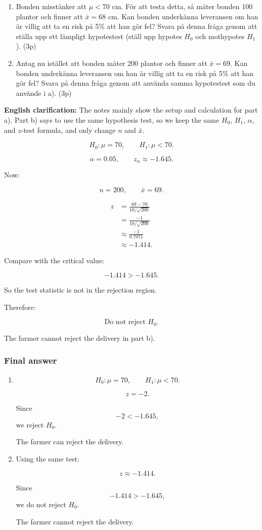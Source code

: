 \documentclass[10pt]{article}
\begin{document}
\begin{enumerate}[label=\alph*)]
\item Bonden misstänker att \(\mu<70\) cm.
För att testa detta, så mäter bonden 100 plantor
och finner att \(\bar{x}=68\) cm.
Kan bonden underkänna leveransen om han är villig
att ta en risk på 5\% att han gör fel?
Svara på denna fråga genom att ställa upp ett
lämpligt hypotestest (ställ upp hypotes \(H_0\)
och mothypotes \(H_1\)).
\hfill (3p)

\item Antag nu istället att bonden mäter 200 plantor
och finner att \(\bar{x}=69\).
Kan bonden underkänna leveransen om han är villig
att ta en risk på 5\% att han gör fel?
Svara på denna fråga genom att använda samma
hypotestest som du använde i a).
\hfill (3p)
\end{enumerate}

\textbf{English clarification:}
The notes mainly show the setup and calculation for
part a). Part b) says to use the same hypothesis test,
so we keep the same \(H_0\), \(H_1\), \(\alpha\),
and \(z\)-test formula, and only change \(n\)
and \(\bar{x}\).

\[
H_0:\mu=70,
\qquad
H_1:\mu<70.
\]

\[
\alpha=0.05,
\qquad
z_\alpha\approx -1.645.
\]

Now:

\[
n=200,
\qquad
\bar{x}=69.
\]

\begin{align*}
z
&=
\frac{69-70}
{10/\sqrt{200}} \\[2mm]
&=
\frac{-1}
{10/\sqrt{200}} \\[2mm]
&\approx
\frac{-1}{0.7071} \\[2mm]
&\approx -1.414.
\end{align*}

Compare with the critical value:

\[
-1.414>-1.645.
\]

So the test statistic is not in the rejection region.

Therefore:

\[
\text{Do not reject } H_0.
\]

The farmer cannot reject the delivery in part b).

\subsubsection*{Final answer}
\begin{enumerate}[label=\alph*)]
\item
\[
H_0:\mu=70,
\qquad
H_1:\mu<70.
\]

\[
z=-2.
\]

Since
\[
-2<-1.645,
\]
we reject \(H_0\).

The farmer can reject the delivery.

\item
Using the same test:

\[
z\approx -1.414.
\]

Since
\[
-1.414>-1.645,
\]
we do not reject \(H_0\).

The farmer cannot reject the delivery.
\end{enumerate}
\end{document}
